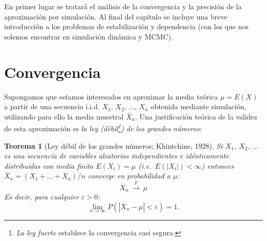 \documentclass[
  10pt,
]{book}
\theoremstyle{break}
\newtheorem{theorem}{Teorema}[chapter]
\theoremstyle{nonumberplain}
\let\oldfootnote\footnote
\renewcommand\footnote[1]{\oldfootnote{\hspace{2mm}#1}}
\begin{document}
En primer lugar se tratará el análisis de la convergencia y la precisión de la aproximación por simulación.
Al final del capítulo se incluye una breve introducción a los problemas de estabilización y dependencia (con los que nos solemos encontrar en simulación dinámica y MCMC).

\hypertarget{convergencia}{%
\section{Convergencia}\label{convergencia}}

Supongamos que estamos interesados en aproximar la media teórica \(\mu = E\left( X\right)\) a partir de una secuencia i.i.d. \(X_{1}\), \(X_{2}\), \(\ldots\), \(X_{n}\) obtenida mediante simulación, utilizando para ello la media muestral \(\bar{X}_{n}\).
Una justificación teórica de la validez de esta aproximación es \emph{la ley (débil\footnote{\emph{La ley fuerte} establece la convergencia casi segura.}) de los grandes números}:

\begin{theorem}[Ley débil de los grandes números; Khintchine, 1928]
\protect\hypertarget{thm:khinchine}{}\label{thm:khinchine}
Si \(X_{1}\), \(X_{2}\), \(\ldots\) es una secuencia de variables aleatorias independientes e idénticamente distribuidas con media finita \(E\left( X_{i}\right) =\mu\) (i.e.~\(E\left( \left\vert X_{i} \right\vert \right) < \infty\)) entonces \(\overline{X}_{n}=\left( X_{1}+\ldots +X_{n}\right) /n\)
converge en probabilidad a \(\mu\): \[\overline{X}_{n}\ \overset{p}{ \longrightarrow }\ \mu\]
Es decir, para cualquier \(\varepsilon >0\):
\[\lim\limits_{n\rightarrow \infty }P\left( \left\vert \overline{X}_{n}-\mu
\right\vert <\varepsilon \right) = 1.\]
\end{theorem}
\end{document}
